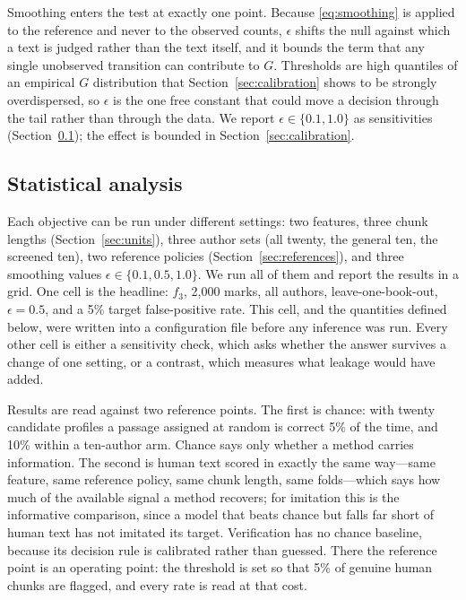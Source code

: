 \documentclass[11pt]{article}
\newcommand{\fThree}{\ensuremath{f_3}\xspace}
\begin{document}
Smoothing enters the test at exactly one point.  Because
\eqref{eq:smoothing} is applied to the reference and never to the observed
counts, \(\epsilon\) shifts the null against which a text is judged rather
than the text itself, and it bounds the term that any single unobserved
transition can contribute to \(G\).  Thresholds are high quantiles of an
empirical \(G\) distribution that Section~\ref{sec:calibration} shows to be
strongly overdispersed, so \(\epsilon\) is the one free constant that could
move a decision through the tail rather than through the data.  We report
\(\epsilon \in \{0.1, 1.0\}\) as sensitivities
(Section~\ref{sec:estimands}); the effect is bounded in
Section~\ref{sec:calibration}.

\subsection{Statistical analysis}
\label{sec:estimands}

Each objective can be run under different settings: two features, three chunk
lengths (Section~\ref{sec:units}), three author sets (all twenty, the
general ten, the screened ten), two reference policies
(Section~\ref{sec:references}), and three smoothing values
\(\epsilon \in \{0.1, 0.5, 1.0\}\).  We run all of them and report the results in a grid.  One cell is the
headline: \fThree, 2,000 marks, all authors, leave-one-book-out,
\(\epsilon = 0.5\), and a 5\% target false-positive rate.  This cell, and
the quantities defined below, were written into a configuration file
before any inference was run.  Every other cell is either a sensitivity
check, which asks whether the answer survives a change of one setting, or
a contrast, which measures what leakage would have added.

Results are read against two reference points.  The first is chance: with
twenty candidate profiles a passage assigned at random is correct 5\% of
the time, and 10\% within a ten-author arm.  Chance says only whether a
method carries information.  The second is human text scored in exactly
the same way---same feature, same reference policy, same chunk length,
same folds---which says how much of the available signal a method
recovers; for imitation this is the informative comparison, since a model
that beats chance but falls far short of human text has not imitated its
target.  Verification has no chance baseline, because its decision rule
is calibrated rather than guessed.  There the reference point is an
operating point: the threshold is set so that 5\% of genuine human chunks
are flagged, and every rate is read at that cost.
\end{document}
